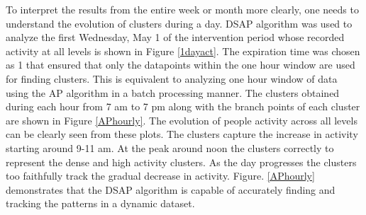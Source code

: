 To interpret the results from the entire week or month more clearly, one needs to understand the evolution of clusters during a day. DSAP algorithm was used to analyze the first Wednesday, May 1 of the intervention period whose recorded activity at all levels is shown in Figure \ref{1dayact}. The expiration time was chosen as 1 that ensured that only the datapoints within the one hour window are used for finding clusters. This is equivalent to analyzing one hour window of data using the AP algorithm in a batch processing manner. The clusters obtained during each hour from 7 am to 7 pm along with the branch points of each cluster are shown in Figure \ref{APhourly}. The evolution of people activity across all levels can be clearly seen from these plots. The clusters capture the increase in activity starting around 9-11 am. At the peak around noon the clusters correctly to represent the dense and high activity clusters. As the day progresses the clusters too faithfully track the gradual decrease in activity. Figure. \ref{APhourly} demonstrates that the DSAP algorithm is capable of accurately finding and tracking the patterns in a dynamic dataset.




